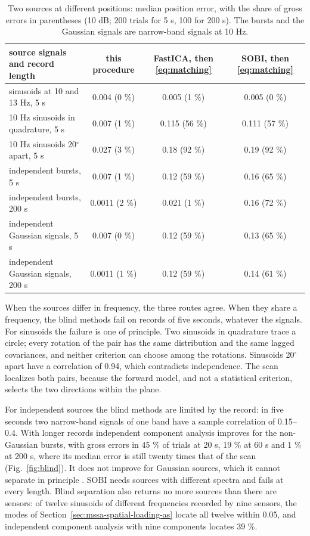 \documentclass{article}
\begin{document}
\begin{table}[htb]
\centering
\caption{Two sources at different positions: median position error, with the share of gross errors in parentheses (10 dB; 200 trials for 5 s, 100 for 200 s). The bursts and the Gaussian signals are narrow-band signals at 10 Hz.}
\label{tab:blind}
\begin{tabular}{l c c c}
\toprule
source signals and record length & this procedure & FastICA, then \eqref{eq:matching} & SOBI, then \eqref{eq:matching} \\
\midrule
sinusoids at 10 and 13 Hz, 5 s & 0.004 (0 \%) & 0.005 (1 \%) & 0.005 (0 \%) \\
10 Hz sinusoids in quadrature, 5 s & 0.007 (1 \%) & 0.115 (56 \%) & 0.111 (57 \%) \\
10 Hz sinusoids 20$^{\circ}$ apart, 5 s & 0.027 (3 \%) & 0.18 (92 \%) & 0.19 (92 \%) \\
independent bursts, 5 s & 0.007 (1 \%) & 0.12 (59 \%) & 0.16 (65 \%) \\
independent bursts, 200 s & 0.0011 (2 \%) & 0.021 (1 \%) & 0.16 (72 \%) \\
independent Gaussian signals, 5 s & 0.007 (0 \%) & 0.12 (59 \%) & 0.13 (65 \%) \\
independent Gaussian signals, 200 s & 0.0011 (1 \%) & 0.12 (59 \%) & 0.14 (61 \%) \\
\bottomrule
\end{tabular}
\end{table}

When the sources differ in frequency, the three routes agree. When they share a frequency, the blind methods fail on records of five seconds, whatever the signals. For sinusoids the failure is one of principle. Two sinusoids in quadrature trace a circle; every rotation of the pair has the same distribution and the same lagged covariances, and neither criterion can choose among the rotations. Sinusoids 20$^{\circ}$ apart have a correlation of 0.94, which contradicts independence. The scan localizes both pairs, because the forward model, and not a statistical criterion, selects the two directions within the plane.

For independent sources the blind methods are limited by the record: in five seconds two narrow-band signals of one band have a sample correlation of 0.15--0.4. With longer records independent component analysis improves for the non-Gaussian bursts, with gross errors in 45 \% of trials at 20 s, 19 \% at 60 s and 1 \% at 200 s, where its median error is still twenty times that of the scan (Fig.~\ref{fig:blind}). It does not improve for Gaussian sources, which it cannot separate in principle \cite{ref-Comon}. SOBI needs sources with different spectra \cite{ref-Belouchrani} and fails at every length. Blind separation also returns no more sources than there are sensors: of twelve sinusoids of different frequencies recorded by nine sensors, the modes of Section~\ref{sec:mssa-spatial-loading-as} locate all twelve within 0.05, and independent component analysis with nine components locates 39 \%.
\end{document}
